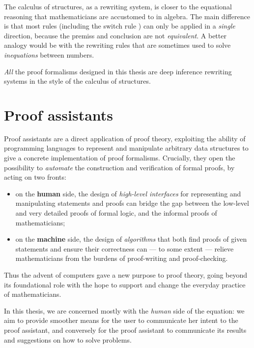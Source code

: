 The calculus of structures, as a rewriting system, is closer to the equational
reasoning that mathematicians are accustomed to in algebra. The main difference
is that most rules (including the switch rule ) can only be applied in a
\emph{single} direction, because the premiss and conclusion are not
\emph{equivalent}. A better analogy would be with the rewriting rules that are
sometimes used to solve \emph{inequations} between numbers.

\begin{emphpar}
\emph{All} the proof formalisms designed in this thesis are deep inference
rewriting systems in the style of the calculus of structures.
\end{emphpar}

\section{Proof assistants}

Proof assistants are a direct application of proof theory, exploiting the
ability of programming languages to represent and manipulate arbitrary data
structures to give a concrete implementation of proof formalisms. Crucially,
they open the possibility to \emph{automate} the construction and verification
of formal proofs, by acting on two fronts:
\begin{itemize}
  \item on the \textbf{human} side, the design of \emph{high-level interfaces}
  for representing and manipulating statements and proofs can bridge the gap
  between the low-level and very detailed proofs of formal logic, and the
  informal proofs of mathematicians;
  \item on the \textbf{machine} side, the design of \emph{algorithms} that both
  find proofs of given statements and ensure their correctness can --- to some
  extent --- relieve mathematicians from the
  burdens of proof-writing and proof-checking.
\end{itemize}
Thus the advent of computers gave a new purpose to proof theory, going beyond
its foundational role with the hope to support and change the everyday practice
of mathematicians.

\begin{emphpar}
In this thesis, we are concerned mostly with the \emph{human} side of the
equation: we aim to provide smoother means for the user to communicate her
intent to the proof assistant, and conversely for the proof assistant to
communicate its results and suggestions on how to solve problems.
\end{emphpar}

